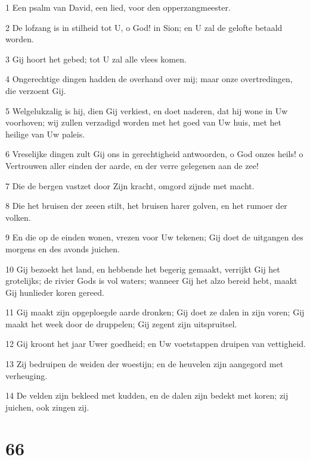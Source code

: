 \par 1 Een psalm van David, een lied, voor den opperzangmeester.
\par 2 De lofzang is in stilheid tot U, o God! in Sion; en U zal de gelofte betaald worden.
\par 3 Gij hoort het gebed; tot U zal alle vlees komen.
\par 4 Ongerechtige dingen hadden de overhand over mij; maar onze overtredingen, die verzoent Gij.
\par 5 Welgelukzalig is hij, dien Gij verkiest, en doet naderen, dat hij wone in Uw voorhoven; wij zullen verzadigd worden met het goed van Uw huis, met het heilige van Uw paleis.
\par 6 Vreselijke dingen zult Gij ons in gerechtigheid antwoorden, o God onzes heils! o Vertrouwen aller einden der aarde, en der verre gelegenen aan de zee!
\par 7 Die de bergen vastzet door Zijn kracht, omgord zijnde met macht.
\par 8 Die het bruisen der zeeen stilt, het bruisen harer golven, en het rumoer der volken.
\par 9 En die op de einden wonen, vrezen voor Uw tekenen; Gij doet de uitgangen des morgens en des avonds juichen.
\par 10 Gij bezoekt het land, en hebbende het begerig gemaakt, verrijkt Gij het grotelijks; de rivier Gods is vol waters; wanneer Gij het alzo bereid hebt, maakt Gij hunlieder koren gereed.
\par 11 Gij maakt zijn opgeploegde aarde dronken; Gij doet ze dalen in zijn voren; Gij maakt het week door de druppelen; Gij zegent zijn uitspruitsel.
\par 12 Gij kroont het jaar Uwer goedheid; en Uw voetstappen druipen van vettigheid.
\par 13 Zij bedruipen de weiden der woestijn; en de heuvelen zijn aangegord met verheuging.
\par 14 De velden zijn bekleed met kudden, en de dalen zijn bedekt met koren; zij juichen, ook zingen zij.

\chapter{66}


